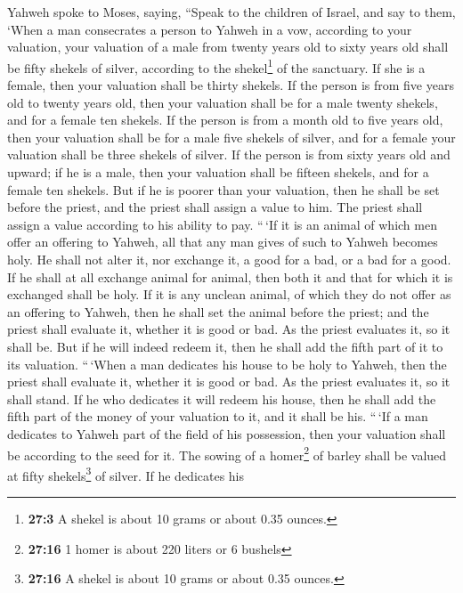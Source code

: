  Yahweh spoke to Moses, saying,  ``Speak to
the children of Israel, and say to them, `When a man consecrates a
person to Yahweh in a vow, according to your valuation, 
your valuation of a male from twenty years old to sixty years old shall
be fifty shekels of silver, according to the shekel\footnote{\textbf{27:3}
  A shekel is about 10 grams or about 0.35 ounces.} of the sanctuary.
 If she is a female, then your valuation shall be thirty
shekels.  If the person is from five years old to twenty
years old, then your valuation shall be for a male twenty shekels, and
for a female ten shekels.  If the person is from a month
old to five years old, then your valuation shall be for a male five
shekels of silver, and for a female your valuation shall be three
shekels of silver.  If the person is from sixty years old
and upward; if he is a male, then your valuation shall be fifteen
shekels, and for a female ten shekels.  But if he is
poorer than your valuation, then he shall be set before the priest, and
the priest shall assign a value to him. The priest shall assign a value
according to his ability to pay.  ``\,`If it is an animal
of which men offer an offering to Yahweh, all that any man gives of such
to Yahweh becomes holy.  He shall not alter it, nor
exchange it, a good for a bad, or a bad for a good. If he shall at all
exchange animal for animal, then both it and that for which it is
exchanged shall be holy.  If it is any unclean animal, of
which they do not offer as an offering to Yahweh, then he shall set the
animal before the priest;  and the priest shall evaluate
it, whether it is good or bad. As the priest evaluates it, so it shall
be.  But if he will indeed redeem it, then he shall add
the fifth part of it to its valuation.  ``\,`When a man
dedicates his house to be holy to Yahweh, then the priest shall evaluate
it, whether it is good or bad. As the priest evaluates it, so it shall
stand.  If he who dedicates it will redeem his house,
then he shall add the fifth part of the money of your valuation to it,
and it shall be his.  ``\,`If a man dedicates to Yahweh
part of the field of his possession, then your valuation shall be
according to the seed for it. The sowing of a homer\footnote{\textbf{27:16}
  1 homer is about 220 liters or 6 bushels} of barley shall be valued at
fifty shekels\footnote{\textbf{27:16} A shekel is about 10 grams or
  about 0.35 ounces.} of silver.  If he dedicates his
